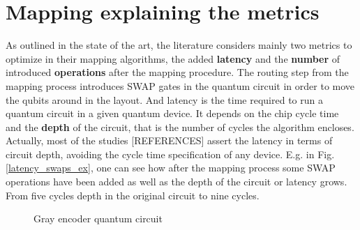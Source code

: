 \section*{Mapping explaining the metrics}
\label{sec:org8ace6db}

As outlined in the state of the art, the literature considers mainly two metrics to optimize in their mapping algorithms, the added \textbf{latency} and the \textbf{number} of introduced \textbf{operations} after the mapping procedure.
The routing step from the mapping process introduces SWAP gates in the quantum circuit in order to move the qubits around in the layout.
And latency is the time required to run a quantum circuit in a given quantum device.
It depends on the chip cycle time and the \textbf{depth} of the circuit, that is the number of cycles the algorithm encloses.
Actually, most of the studies [REFERENCES] assert the latency in terms of circuit depth, avoiding the cycle time specification of any device.
E.g. in Fig. \ref{latency_swaps_ex}, one can see how after the mapping process some SWAP operations have been added as well as the depth of the circuit or latency grows.
From five cycles depth in the original circuit to nine cycles.


\begin{minipage}{.4\textwidth}
\begin{figure}[h!]
\caption{Gray encoder quantum circuit}
\label{latency_swaps_ex_orig}
\end{figure}
\end{minipage}

